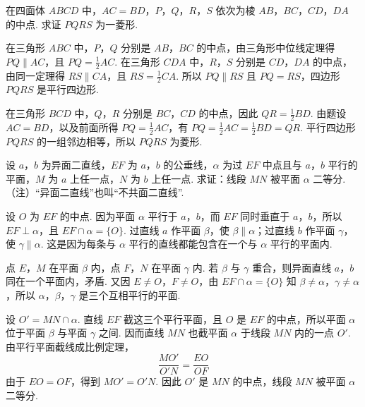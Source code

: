 \begin{problem}
在四面体 \(ABCD\) 中，\(AC=BD\)，\(P\)，\(Q\)，\(R\)，\(S\) 依次为棱 \(AB\)，\(BC\)，\(CD\)，\(DA\) 的中点. 求证 \(PQRS\) 为一菱形.
\end{problem}

\begin{solution}
在三角形 \(ABC\) 中，\(P\)，\(Q\) 分别是 \(AB\)，\(BC\) 的中点，由三角形中位线定理得 \(PQ\parallel AC\)，且 \(PQ=\frac{1}{2}AC\).
在三角形 \(CDA\) 中，\(R\)，\(S\) 分别是 \(CD\)，\(DA\) 的中点，由同一定理得 \(RS\parallel CA\)，且 \(RS=\frac{1}{2}CA\).
所以 \(PQ\parallel RS\) 且 \(PQ=RS\)，四边形 \(PQRS\) 是平行四边形.

在三角形 \(BCD\) 中，\(Q\)，\(R\) 分别是 \(BC\)，\(CD\) 的中点，因此 \(QR=\frac{1}{2}BD\). 由题设 \(AC=BD\)，以及前面所得 \(PQ=\frac{1}{2}AC\)，有 \(PQ=\frac{1}{2}AC=\frac{1}{2}BD=QR\).
平行四边形 \(PQRS\) 的一组邻边相等，所以 \(PQRS\) 为菱形.

\end{solution}

\begin{problem}
设 \(a\)，\(b\) 为异面二直线，\(EF\) 为 \(a\)，\(b\) 的公垂线，\(\alpha\) 为过 \(EF\) 中点且与 \(a\)，\(b\) 平行的平面，\(M\) 为 \(a\) 上任一点，\(N\) 为 \(b\) 上任一点. 求证：线段 \(MN\) 被平面 \(\alpha\) 二等分. （注）“异面二直线”也叫“不共面二直线”.
\end{problem}

\begin{solution}
设 \(O\) 为 \(EF\) 的中点. 因为平面 \(\alpha\) 平行于 \(a\)，\(b\)，而 \(EF\) 同时垂直于 \(a\)，\(b\)，所以 \(EF\perp\alpha\)，且 \(EF\cap\alpha=\{O\}\). 过直线 \(a\) 作平面 \(\beta\)，使 \(\beta\parallel\alpha\)；过直线 \(b\) 作平面 \(\gamma\)，使 \(\gamma\parallel\alpha\). 这是因为每条与 \(\alpha\) 平行的直线都能包含在一个与 \(\alpha\) 平行的平面内.

点 \(E\)，\(M\) 在平面 \(\beta\) 内，点 \(F\)，\(N\) 在平面 \(\gamma\) 内. 若 \(\beta\) 与 \(\gamma\) 重合，则异面直线 \(a\)，\(b\) 同在一个平面内，矛盾. 又因 \(E\ne O\)，\(F\ne O\)，由 \(EF\cap\alpha=\{O\}\) 知 \(\beta\ne\alpha\)，\(\gamma\ne\alpha\)，所以 \(\alpha\)，\(\beta\)，\(\gamma\) 是三个互相平行的平面.

设 \(O'=MN\cap\alpha\). 直线 \(EF\) 截这三个平行平面，且 \(O\) 是 \(EF\) 的中点，所以平面 \(\alpha\) 位于平面 \(\beta\) 与平面 \(\gamma\) 之间. 因而直线 \(MN\) 也截平面 \(\alpha\) 于线段 \(MN\) 内的一点 \(O'\). 由平行平面截线成比例定理，
\[
\frac{MO'}{O'N}=\frac{EO}{OF}
\]
由于 \(EO=OF\)，得到 \(MO'=O'N\). 因此 \(O'\) 是 \(MN\) 的中点，线段 \(MN\) 被平面 \(\alpha\) 二等分.

\end{solution}


